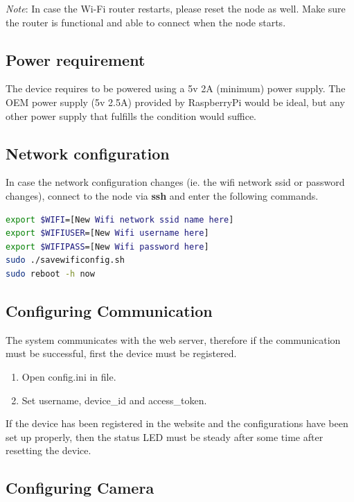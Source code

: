 \documentclass{article}
\begin{document}
\emph{Note}: In case the Wi-Fi router restarts, please reset the node as well. Make sure the router is functional and able to connect when the node starts.

\subsection{Power requirement}  %

The device requires to be powered using a 5v 2A (minimum) power supply. The OEM power supply (5v 2.5A) provided by RaspberryPi would be ideal, but any other power supply that fulfills the condition would suffice.

\subsection{Network configuration}

In case the network configuration changes (ie. the wifi network ssid or password changes), connect to the node via \textbf{ssh} and enter the following commands.
\begin{lstlisting}[language=bash]
export $WIFI=[New Wifi network ssid name here]
export $WIFIUSER=[New Wifi username here]
export $WIFIPASS=[New Wifi password here]
sudo ./savewificonfig.sh
sudo reboot -h now
\end{lstlisting}



\subsection{Configuring Communication}

The system communicates with the web server, therefore if the communication must be successful, first the device must be registered.

\begin{enumerate}

  \item Open config.ini in file.
  \item Set username, device\_id and access\_token.
  
\end{enumerate}

If the device has been registered in the website and the configurations have been set up properly, then the status LED must be steady after some time after resetting the device.

\subsection{Configuring Camera} %
\end{document}
